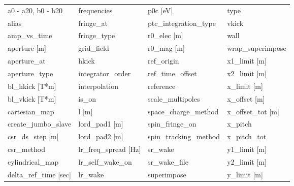  \begin{tabular}{llll} \toprule
a0 - a20, b0 - b20               & frequencies                      & p0c [eV]                         & type                             \\
alias                            & fringe_at                        & ptc_integration_type             & vkick                            \\
amp_vs_time                      & fringe_type                      & r0_elec [m]                      & wall                             \\
aperture [m]                     & grid_field                       & r0_mag [m]                       & wrap_superimpose                 \\
aperture_at                      & hkick                            & ref_origin                       & x1_limit [m]                     \\
aperture_type                    & integrator_order                 & ref_time_offset                  & x2_limit [m]                     \\
bl_hkick [T*m]                   & interpolation                    & reference                        & x_limit [m]                      \\
bl_vkick [T*m]                   & is_on                            & scale_multipoles                 & x_offset [m]                     \\
cartesian_map                    & l [m]                            & space_charge_method              & x_offset_tot [m]                 \\
create_jumbo_slave               & lord_pad1 [m]                    & spin_fringe_on                   & x_pitch                          \\
csr_ds_step [m]                  & lord_pad2 [m]                    & spin_tracking_method             & x_pitch_tot                      \\
csr_method                       & lr_freq_spread [Hz]              & sr_wake                          & y1_limit [m]                     \\
cylindrical_map                  & lr_self_wake_on                  & sr_wake_file                     & y2_limit [m]                     \\
delta_ref_time [sec]             & lr_wake                          & superimpose                      & y_limit [m]                      \\

\end{tabular}
